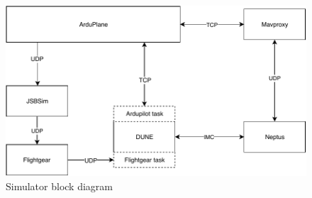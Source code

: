     \begin{figure}
        \centering
        \includegraphics[scale=0.8]{Images/Simulator.pdf}
        \caption{Simulator block diagram}
        \label{fig:sim-diag}
    \end{figure}
%
%
